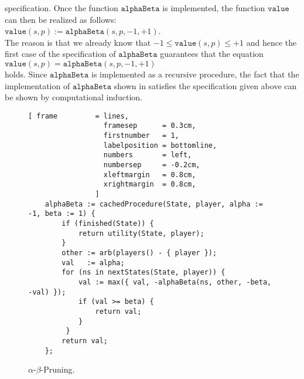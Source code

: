 specification.  Once the function $\mathtt{alphaBeta}$ is implemented, the function $\mathtt{value}$ can then
be realized as follows: 
\\[0.2cm]
\hspace*{1.3cm}
$\mathtt{value}(s, p ) := \mathtt{alphaBeta}(s, p, -1, +1)$.
\\[0.2cm]
The reason is that we already know that $-1 \leq \mathtt{value}(s,p) \leq +1$ and hence the first case of the
specification of $\mathtt{alphaBeta}$ guarantees that the equation
\\[0.2cm]
\hspace*{1.3cm}
$\mathtt{value}(s,p) = \mathtt{alphaBeta}(s,p,-1,+1)$
\\[0.2cm]
holds.  Since $\mathtt{alphaBeta}$ is implemented as a recursive procedure, 
the fact that the implementation of $\mathtt{alphaBeta}$ shown in  satisfies the
specification given above can be shown by computational induction.  


\begin{figure}[!ht]
\centering
\begin{Verbatim}[ frame         = lines, 
                  framesep      = 0.3cm, 
                  firstnumber   = 1,
                  labelposition = bottomline,
                  numbers       = left,
                  numbersep     = -0.2cm,
                  xleftmargin   = 0.8cm,
                  xrightmargin  = 0.8cm,
                ]
    alphaBeta := cachedProcedure(State, player, alpha := -1, beta := 1) {
        if (finished(State)) {
            return utility(State, player);
        }
        other := arb(players() - { player });
        val   := alpha;
        for (ns in nextStates(State, player)) {
            val := max({ val, -alphaBeta(ns, other, -beta, -val) });
            if (val >= beta) {
                return val;
            }
         }
        return val;
    };
\end{Verbatim}
\vspace*{-0.3cm}
\caption{$\alpha$-$\beta$-Pruning.}
\label{fig:game-alpha-beta.stlx}
\end{figure}

